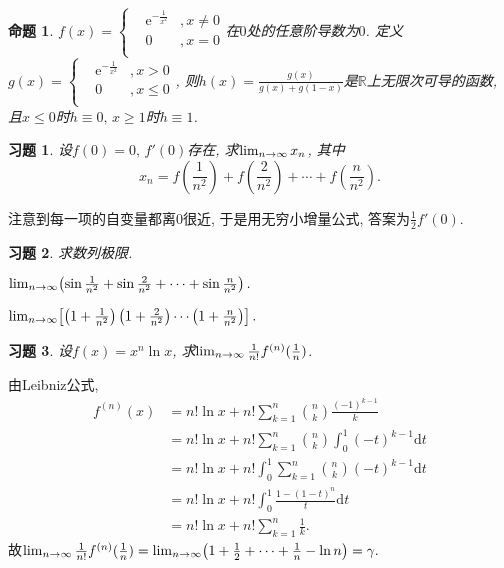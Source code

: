 \documentclass[11pt,a4paper]{ctexart}
\makeatletter
\theoremstyle{thmseries} %
\newtheorem{prop}{命题}[section]
\theoremstyle{exerseries}
\newtheorem{exer}{习题}[section]
\renewenvironment{proof}[1][\proofname]{\par
  \pushQED{\qed}%
  \normalfont \topsep6\p@\@plus6\p@\relax
  \trivlist
  \item[\hskip\labelsep
        \itshape
    #1\@addpunct{}]\ignorespaces
}{%
  \popQED\endtrivlist\@endpefalse
}
\newenvironment{sol}{\begin{proof}[\bfseries\upshape 解\quad]}{\end{proof}}
\newcommand{\bra}[1]{\mathopen{}\left(#1\right)}
\newcommand{\sbra}[1]{\mathopen{}\left[#1\right]}
\newcommand{\R}{\mathbb{R}}
\renewcommand{\d}{\mathrm{d}}
\newcommand{\e}{\mathrm{e}}
\def \nti {\mathnormal{n}\to\infty}
\makeatother
\begin{document}
\begin{prop}
	$f(x)=\left\{\begin{aligned}
		&\e^{-\frac{1}{x^2}}&,x\neq0\\
		&0&,x=0\\
	\end{aligned}\right.$在$0$处的任意阶导数为$0$. 定义$g(x)=\left\{\begin{aligned}
		&\e^{-\frac{1}{x^2}}&,x>0\\
		&0&,x\leq0\\
	\end{aligned}\right.$, 则$h(x)=\frac{g(x)}{g(x)+g(1-x)}$是$\R$上无限次可导的函数, 且$x\leq0$时$h\equiv0,\,x\geq1$时$h\equiv1$. 
\end{prop}

\begin{exer}
	设$f(0)=0,\,f'(0)$存在, 求$\lim_{\nti}x_n$, 其中
	\[x_n=f\bra{\frac{1}{n^2}}+f\bra{\frac{2}{n^2}}+\cdots+f\bra{\frac{n}{n^2}}.\]
\end{exer}
\begin{sol}
	注意到每一项的自变量都离$0$很近, 于是用无穷小增量公式, 答案为$\frac{1}{2}f'(0)$. 
\end{sol}

\begin{exer}
	求数列极限. 
	\begin{enumerate}
	\end{enumerate}
\end{exer}

\begin{exer}
	设$f(x)=x^n\ln x$, 求$\lim_{\nti}\frac{1}{n!}f^{(n)}(\frac{1}{n})$.
\end{exer}
\begin{sol}
	由Leibniz公式,
	\begin{align*}
		f^{(n)}(x)&=n!\ln x+n!\sum_{k=1}^{n}\binom{n}{k}\frac{(-1)^{k-1}}{k}\\
		&=n!\ln x+n!\sum_{k=1}^{n}\binom{n}{k}\int_{0}^{1}(-t)^{k-1}\d t\\
		&=n!\ln x+n!\int_{0}^{1}\sum_{k=1}^{n}\binom{n}{k}(-t)^{k-1}\d t\\
		&=n!\ln x+n!\int_{0}^{1}\frac{1-(1-t)^n}{t}\d t\\
		&=n!\ln x+n!\sum_{k=1}^{n}\frac{1}{k}.
	\end{align*}
	故$\lim_{\nti}\frac{1}{n!}f^{(n)}(\frac{1}{n})=\lim_{\nti}\bra{1+\frac{1}{2}+\cdots+\frac{1}{n}-\ln n}=\gamma.$
\end{sol}
\end{document}
